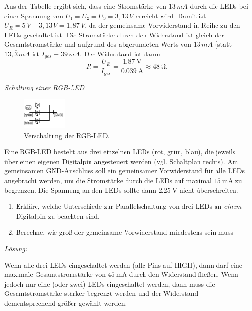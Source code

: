\documentclass[ngerman, 11pt]{scrreprt}
\begin{document}
	\medskip
	Aus der Tabelle ergibt sich, dass eine Stromstärke von $13\,mA$ durch die LEDs bei einer Spannung von $U_1 = U_2 = U_3 = 3,13\,V$ erreicht wird. Damit ist $U_R=5\,V - 3,13\,V = 1,87\,V$, da der gemeinsame Vorwiderstand in Reihe zu den LEDs geschaltet ist. Die Stromstärke durch den Widerstand ist gleich der Gesamtstromstärke und aufgrund des abgerundeten Werts von $13\,mA$ (statt $13,\overline{3}\,mA$ ist $I_{ges}=39\,mA$. Der Widerstand ist dann:
	\begin{equation*}
		R=\frac{U_R}{I_{ges}}=\frac{\SI{1,87}{\volt}}{\SI{0,039}{\ampere}} \approx \SI{48}{\ohm}.
	\end{equation*}
	\bigskip
	
	\begin{aufgabe} \emph{Schaltung einer RGB-LED}
		
		\begin{figure}
			\vspace{-\baselineskip}
			\centering
			\includegraphics[width=0.2\textwidth]{../pics/rgb-led-schaltplan.png}
			\caption{Verschaltung der RGB-LED.}
			\vspace{-\baselineskip}
		\end{figure}
		Eine RGB-LED besteht aus drei einzelnen LEDs (rot, grün, blau), die jeweils über einen eigenen Digitalpin angesteuert werden (vgl. Schaltplan rechts). Am gemeinsamen GND-Anschluss soll ein gemeinsamer Vorwiderstand für alle LEDs angebracht werden, um die Stromstärke durch die LEDs auf maximal $\SI{15}{\milli\ampere}$ zu begrenzen. Die Spannung an den LEDs sollte dann $\SI{2,25}{\volt}$ nicht überschreiten.
		\begin{enumerate}[label=\alph*), itemsep=0ex]
			\item Erkläre, welche Unterschiede zur Parallelschaltung von drei LEDs an \emph{einem} Digitalpin zu beachten sind.
			\item Berechne, wie groß der gemeinsame Vorwiderstand mindestens sein muss.
		\end{enumerate}
	\end{aufgabe}
	
	\bigskip
	\emph{Lösung:}
	
	Wenn alle drei LEDs eingeschaltet werden (alle Pins auf HIGH), dann darf eine maximale Gesamtstromstärke von $\SI{45}{\milli\ampere}$ durch den Widerstand fließen. Wenn jedoch nur eine (oder zwei) LEDs eingeschaltet werden, dann muss die Gesamtstromstärke stärker begrenzt werden und der Widerstand dementsprechend größer gewählt werden. 
	
\end{document}
